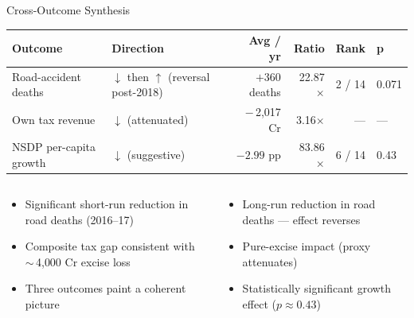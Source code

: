 \documentclass[aspectratio=169,11pt]{beamer}
\newcommand{\rupee}{\faRupeeSign\,}
\newcommand{\toptight}{\vspace{-0.15cm}}
\begin{document}
\begin{frame}{Cross-Outcome Synthesis}
  \toptight
  \scriptsize
  \begin{tabularx}{\linewidth}{@{}lXrrrl@{}}
    \toprule
    \rowcolor{NavyPrimary}\color{white}\textbf{Outcome} &
    \color{white}\textbf{Direction} &
    \color{white}\textbf{Avg / yr} &
    \color{white}\textbf{Ratio} &
    \color{white}\textbf{Rank} &
    \color{white}\textbf{p} \\
    \midrule
    Road-accident deaths   & $\downarrow$ then $\uparrow$ (reversal post-2018) & $+360$ deaths      & 22.87$\times$ & 2 / 14 & 0.071 \\
    Own tax revenue        & $\downarrow$ (attenuated)                          & $-$\rupee 2{,}017 Cr & 3.16$\times$  & ---    & ---   \\
    NSDP per-capita growth & $\downarrow$ (suggestive)                          & $-2.99$ pp         & 83.86$\times$ & 6 / 14 & 0.43  \\
    \bottomrule
  \end{tabularx}

  \vspace{0.45cm}
  \begin{columns}[T,onlytextwidth]
      \begin{tcolorbox}[greenbox,title={\faCheckCircle\enspace What we can claim}]
        \scriptsize\setlength\itemsep{1pt}
        \begin{itemize}
          \item Significant short-run reduction in road deaths (2016--17)
          \item Composite tax gap consistent with $\sim$\rupee 4{,}000 Cr excise loss
          \item Three outcomes paint a coherent picture
        \end{itemize}
      \end{tcolorbox}

      \begin{tcolorbox}[redbox,title={\faTimesCircle\enspace What we cannot claim}]
        \scriptsize\setlength\itemsep{1pt}
        \begin{itemize}
          \item Long-run reduction in road deaths --- effect reverses
          \item Pure-excise impact (proxy attenuates)
          \item Statistically significant growth effect ($p \approx 0.43$)
        \end{itemize}
      \end{tcolorbox}
  \end{columns}
\end{frame}
\end{document}

